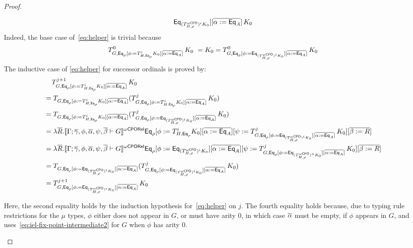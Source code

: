 \documentclass[acmsmall,review,anonymous]{acmart}
\theoremstyle{definition}
\begin{document}
\begin{proof}
\begin{itemize}
\begin{itemize}
\begin{equation}
{    \mathsf{Eq}_{(T^{{\omega\mathsf{CPO}}}_{H,\rho})^i K_0}][\overline{\alpha :=
      \mathsf{Eq}_A}]}\,K_0
\end{equation}
Indeed, the base case of~\eqref{eq:helper} is trivial because
\[T^0_{G,
  \mathsf{Eq}_{\rho}[\phi := T^{i}_{H,\mathsf{Eq}_{\rho}} K_0][\overline{\alpha :=
      \mathsf{Eq}_A}]}\,K_0 \ = K_0 = T^0_{G, \mathsf{Eq}_{\rho}[\phi :=
    \mathsf{Eq}_{(T^{{\omega\mathsf{CPO}}}_{H,\rho})^i K_0}][\overline{\alpha :=
      \mathsf{Eq}_A}]}\,K_0\] The inductive case of \eqref{eq:helper} for
successor ordinals is proved by: \\
\begin{align*}
&\;\;\;\; T^{j+1}_{G, \mathsf{Eq}_{\rho}[\phi := T^{i}_{H,\mathsf{Eq}_{\rho}} K_0][\overline{\alpha := \mathsf{Eq}_A}]}\,K_0 \\
&= T_{G, \mathsf{Eq}_{\rho}[\phi := T^{i}_{H,\mathsf{Eq}_{\rho}} K_0][\overline{\alpha
        := \mathsf{Eq}_A}]} (T^{j}_{G, \mathsf{Eq}_{\rho}[\phi := T^{i}_{H,\mathsf{Eq}_{\rho}}
      K_0][\overline{\alpha := \mathsf{Eq}_A}]}\,K_0) \\
&= T_{G, \mathsf{Eq}_{\rho}[\phi := T^{i}_{H,\mathsf{Eq}_{\rho}} K_0][\overline{\alpha
        := \mathsf{Eq}_A}]} (T^{j}_{G, \mathsf{Eq}_{\rho}[\phi :=
      \mathsf{Eq}_{(T^{{\omega\mathsf{CPO}}}_{H,\rho})^i K_0}][\overline{\alpha :=
        \mathsf{Eq}_A}]}\,K_0) \\
&= \lambda \overline{R}. \llbracket{\Gamma; \overline{\gamma}, \phi, \overline{\alpha}, \psi,
    \overline{\beta} \vdash G}\rrbracket^{{\omega\mathsf{CPORel}}} \mathsf{Eq}_{\rho} [\phi := T^{i}_{H,\mathsf{Eq}_{\rho}}
    K_0][\overline{\alpha := \mathsf{Eq}_A}][\psi := T^{j}_{G, \mathsf{Eq}_{\rho}[\phi
        := \mathsf{Eq}_{(T^{{\omega\mathsf{CPO}}}_{H,\rho})^i K_0}][\overline{\alpha :=
          \mathsf{Eq}_A}]}\,K_0][\overline{\beta := R}] \\
&= \lambda \overline{R}. \llbracket{\Gamma; \overline{\gamma}, \phi, \overline{\alpha}, \psi,
    \overline{\beta} \vdash G}\rrbracket^{{\omega\mathsf{CPORel}}} \mathsf{Eq}_{\rho} [\phi := \mathsf{Eq}_{(T^{{\omega\mathsf{CPO}}}_{H,\rho})^i
      K_0}][\overline{\alpha := \mathsf{Eq}_A}][\psi := T^{j}_{G,
      \mathsf{Eq}_{\rho}[\phi := \mathsf{Eq}_{(T^{{\omega\mathsf{CPO}}}_{H,\rho})^n
          K_0}][\overline{\alpha := \mathsf{Eq}_A}]}\,K_0][\overline{\beta :=
      R}] \\
&= T_{G, \mathsf{Eq}_{\rho}[\phi := \mathsf{Eq}_{(T^{{\omega\mathsf{CPO}}}_{H,\rho})^i
        K_0}][\overline{\alpha := \mathsf{Eq}_A}]} (T^{j}_{G, \mathsf{Eq}_{\rho}[\phi
      := \mathsf{Eq}_{(T^{{\omega\mathsf{CPO}}}_{H,\rho})^i K_0}][\overline{\alpha :=
        \mathsf{Eq}_A}]}\,K_0) \\
&= T^{j+1}_{G, \mathsf{Eq}_{\rho}[\phi := \mathsf{Eq}_{(T^{{\omega\mathsf{CPO}}}_{H,\rho})^i
        K_0}][\overline{\alpha := \mathsf{Eq}_A}]}\,K_0
\end{align*}

Here, the second equality holds by the induction hypothesis
for~\eqref{eq:helper} on $j$. The fourth equality holds because,
due to typing rule restrictions for the $\mu$ types,
$\phi$ either does not appear in $G$, or must have arity $0$, in which case
$\overline{\alpha}$ must be empty, if $\phi$ appears in $G$, and
uses~\eqref{eq:iel-fix-point-intermediate2} for $G$ when $\phi$ has
arity $0$.


\end{itemize}
\end{itemize}
\end{proof}
\end{document}
